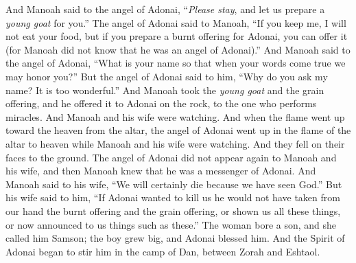 \begin{biblechapter}
\verse And Manoah said to the angel of Adonai, “\textit{Please stay}, and let us prepare a \textit{young goat} for you.”
\verse The angel of Adonai said to Manoah, “If you keep me, I will not eat your food, but if you prepare a burnt offering for Adonai, you can offer it (for Manoah did not know that he was an angel of Adonai).”
\verse And Manoah said to the angel of Adonai, “What is your name so that when your words come true we may honor you?”
\verse But the angel of Adonai said to him, “Why do you ask my name? It is too wonderful.”
\verse And Manoah took the \textit{young goat} and the grain offering, and he offered it to Adonai on the rock, to the one who performs miracles. And Manoah and his wife were watching.
\verse And when the flame went up toward the heaven from the altar, the angel of Adonai went up in the flame of the altar to heaven while Manoah and his wife were watching. And they fell on their faces to the ground.
\verse The angel of Adonai did not appear again to Manoah and his wife, and then Manoah knew that he was a messenger of Adonai.
\verse And Manoah said to his wife, “We will certainly die because we have seen God.”
\verse But his wife said to him, “If Adonai wanted to kill us he would not have taken from our hand the burnt offering and the grain offering, or shown us all these things, or now announced to us things such as these.”
\verse The woman bore a son, and she called him Samson; the boy grew big, and Adonai blessed him.
\verse And the Spirit of Adonai began to stir him in the camp of Dan, between Zorah and Eshtaol.
\end{biblechapter}

